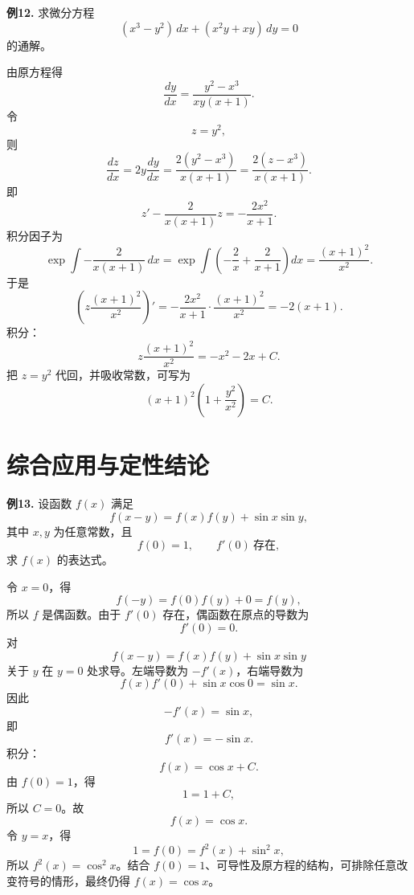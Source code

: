 \begin{problemblock}
\textbf{例12.} 求微分方程
\[
(x^3-y^2)\,dx+(x^2y+xy)\,dy=0
\]
的通解。
\end{problemblock}
\begin{solutionblock}
由原方程得
\[
\frac{dy}{dx}=\frac{y^2-x^3}{xy(x+1)}.
\]
令
\[
z=y^2,
\]
则
\[
\frac{dz}{dx}=2y\frac{dy}{dx}
=\frac{2(y^2-x^3)}{x(x+1)}
=\frac{2(z-x^3)}{x(x+1)}.
\]
即
\[
z'-\frac{2}{x(x+1)}z=-\frac{2x^2}{x+1}.
\]
积分因子为
\[
\exp\int-\frac{2}{x(x+1)}\,dx
=\exp\int\left(-\frac2x+\frac2{x+1}\right)dx
=\frac{(x+1)^2}{x^2}.
\]
于是
\[
\left(z\frac{(x+1)^2}{x^2}\right)'
=-\frac{2x^2}{x+1}\cdot\frac{(x+1)^2}{x^2}
=-2(x+1).
\]
积分：
\[
z\frac{(x+1)^2}{x^2}=-x^2-2x+C.
\]
把 \(z=y^2\) 代回，并吸收常数，可写为
\[
(x+1)^2\left(1+\frac{y^2}{x^2}\right)=C.
\]
\end{solutionblock}

\section{综合应用与定性结论}

\begin{problemblock}
\textbf{例13.} 设函数 \(f(x)\) 满足
\[
f(x-y)=f(x)f(y)+\sin x\sin y,
\]
其中 \(x,y\) 为任意常数，且
\[
f(0)=1,\qquad f'(0)\ \text{存在},
\]
求 \(f(x)\) 的表达式。
\end{problemblock}
\begin{solutionblock}
令 \(x=0\)，得
\[
f(-y)=f(0)f(y)+0=f(y),
\]
所以 \(f\) 是偶函数。由于 \(f'(0)\) 存在，偶函数在原点的导数为
\[
f'(0)=0.
\]
对
\[
f(x-y)=f(x)f(y)+\sin x\sin y
\]
关于 \(y\) 在 \(y=0\) 处求导。左端导数为 \(-f'(x)\)，右端导数为
\[
f(x)f'(0)+\sin x\cos0=\sin x.
\]
因此
\[
-f'(x)=\sin x,
\]
即
\[
f'(x)=-\sin x.
\]
积分：
\[
f(x)=\cos x+C.
\]
由 \(f(0)=1\)，得
\[
1=1+C,
\]
所以 \(C=0\)。故
\[
f(x)=\cos x.
\]
令 \(y=x\)，得
\[
1=f(0)=f^2(x)+\sin^2x,
\]
所以 \(f^2(x)=\cos^2x\)。结合 \(f(0)=1\)、可导性及原方程的结构，可排除任意改变符号的情形，最终仍得 \(f(x)=\cos x\)。
\end{solutionblock}


